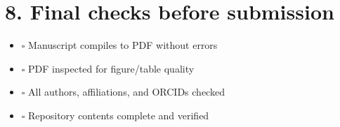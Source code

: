 \documentclass[11pt]{article}
\newcommand{\cbox}{$\square$ }
\begin{document}
\section*{8. Final checks before submission}

\begin{itemize}[leftmargin=1.2cm]
    \item \cbox Manuscript compiles to PDF without errors
    \item \cbox PDF inspected for figure/table quality
    \item \cbox All authors, affiliations, and ORCIDs checked
    \item \cbox Repository contents complete and verified
\end{itemize}
\end{document}
